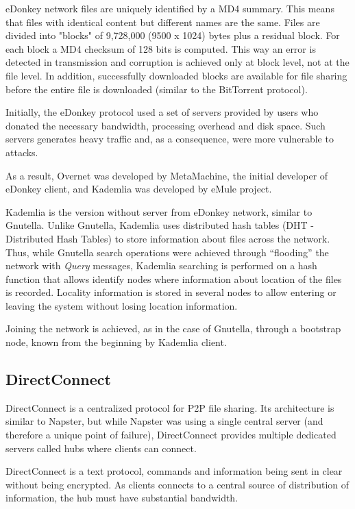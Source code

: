 eDonkey network files are uniquely identified by a MD4 summary. This means
that files with identical content but different names are the same. Files are
divided into "blocks" of 9,728,000 (9500 x 1024) bytes plus a residual block.
For each block a MD4 checksum of 128 bits is computed. This way an error is
detected in transmission and corruption is achieved only at block level, not
at the file level. In addition, successfully downloaded blocks are available
for file sharing before the entire file is downloaded (similar to the
BitTorrent protocol).

Initially, the eDonkey protocol used a set of servers provided by users who
donated the necessary bandwidth, processing overhead and disk space. Such
servers generates heavy traffic and, as a consequence, were more vulnerable to
attacks.

As a result, Overnet was developed by MetaMachine, the initial developer of
eDonkey client, and Kademlia was developed by eMule project.

Kademlia is the version without server from eDonkey network, similar to
Gnutella.  Unlike Gnutella, Kademlia uses distributed hash tables (DHT -
Distributed Hash Tables) to store information about files across the network.
Thus, while Gnutella search operations were achieved through ``flooding'' the
network with \textit{Query} messages, Kademlia searching is performed on a
hash function that allows identify nodes where information about location of
the files is recorded. Locality information is stored in several nodes to
allow entering or leaving the system without losing location information.

Joining the network is achieved, as in the case of Gnutella, through a bootstrap
node, known from the beginning by Kademlia client.

\subsection{DirectConnect}

DirectConnect is a centralized protocol for P2P file sharing. Its architecture
is similar to Napster, but while Napster was using a single central server
(and therefore a unique point of failure), DirectConnect provides multiple
dedicated servers called hubs where clients can connect.

DirectConnect is a text protocol, commands and information being sent in clear
without being encrypted. As clients connects to a central source of
distribution of information, the hub must have substantial bandwidth.

